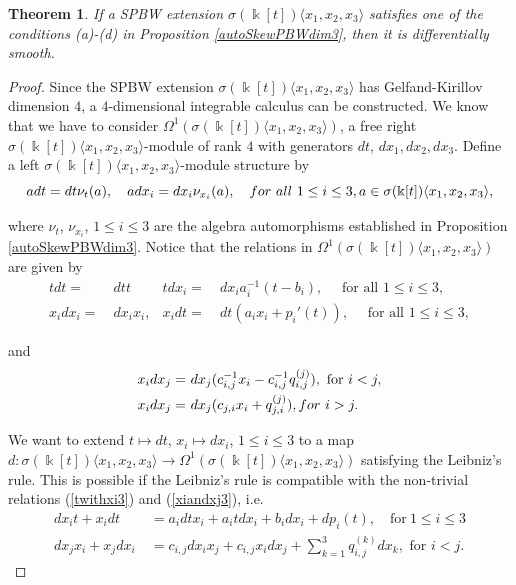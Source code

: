 \documentclass{amsart}
\newtheorem{theorem}{Theorem}[section]
\theoremstyle{definition}
\theoremstyle{remark}
\numberwithin{equation}{section}
\begin{document}
\begin{theorem}\label{smoothPBW3}
If a SPBW extension $\sigma(\Bbbk[t])\langle x_1, x_2, x_3\rangle$ satisfies one of the conditions {\rm (a)-(d)} in Proposition \ref{autoSkewPBWdim3}, then it is differentially smooth.
\end{theorem}
\begin{proof}
Since the SPBW extension $\sigma(\Bbbk[t])\langle x_1, x_2, x_3\rangle$ has Gelfand-Kirillov dimension $4$, a $4$-dimensional integrable calculus can be constructed. We know that we have to consider $\Omega^{1}(\sigma(\Bbbk[t])\langle x_1, x_2, x_3\rangle)$, a free right $\sigma(\Bbbk[t])\langle x_1, x_2, x_3\rangle$-module of rank $4$ with generators $dt$, $dx_1, dx_2, dx_3$. Define a left $\sigma(\Bbbk[t])\langle x_1, x_2, x_3\rangle$-module structure by
    \begin{equation}\label{relrightmod3}
        adt = dt \nu_t(a), \quad adx_i = dx_i\nu_{x_i}(a),  \quad {\rm for\ all}\ 1\leq i \leq 3, a\in \sigma(\Bbbk[t])\langle x_1, x_2, x_3\rangle,
    \end{equation}
    
where $\nu_t$, $\nu_{x_i}$, $1 \leq i \leq 3$ are the algebra automorphisms established in Proposition \ref{autoSkewPBWdim3}. Notice that the relations in $\Omega^{1}(\sigma(\Bbbk[t])\langle x_1, x_2, x_3\rangle)$ are given by
    \begin{align}
        tdt = &\ dt t & tdx_i = &\ dx_ia_i^{-1}(t-b_i), \quad \text{ for all } 1\leq i \leq 3, \label{rel13}  \\
        x_idx_i = &\ dx_ix_i,  &  x_idt = &\ dt(a_ix_i+p_i'(t)), \quad \text{ for all } 1\leq i \leq 3, \label{rel23} 
         \end{align}

and 
        \begin{align}
        x_idx_j = &\ dx_j(c_{i,j}^{-1}x_i-c_{i,j}^{-1}q_{i,j}^{(j)}), \text{ for } i<j, \\   x_idx_j = &\ dx_j(c_{j,i}x_i+q_{j,i}^{(j)}), {\rm for}\ i > j. \label{rel33} 
    \end{align}

We want to extend $t\mapsto dt$, $x_i\mapsto dx_i$, $1\leq i \leq 3$ to a map $d: \sigma(\Bbbk[t])\langle x_1, x_2, x_3\rangle \to \Omega^{1}(\sigma(\Bbbk[t])\langle x_1, x_2, x_3\rangle)$ satisfying the Leibniz's rule. This is possible if the Leibniz's rule is compatible with the non-trivial relations {\rm (}\ref{twithxi3}{\rm )} and {\rm (}\ref{xiandxj3}{\rm )}, i.e.
    \begin{align*}
        dx_it+x_idt &\ = a_idtx_i+a_itdx_i+b_idx_i+dp_i(t), \quad \text{for}\ 1\leq i \leq 3 \\
        dx_jx_i+x_jdx_i &\ = c_{i,j}dx_ix_j+c_{i,j}x_idx_j +\sum_{k=1}^{3}q_{i,j}^{(k)}dx_k, \text{ for } i<j.
    \end{align*}
    

\end{proof}
\end{document}

